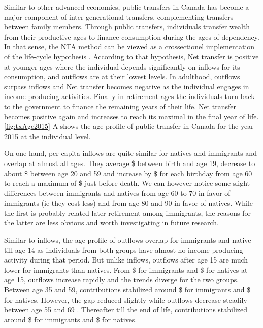 Similar to other advanced economies, public transfers in Canada has become a major component of inter-generational transfers, complementing transfers between family members.
Through public transfers, individuals transfer wealth from their productive ages to finance consumption during the ages of dependency.
In that sense, the NTA method can be viewed as a crossectionel implementation of the life-cycle hypothesis \citep{Ando:1963ea,Deaton:2005vr}.
According to that hypothesis, Net transfer is positive at younger ages where the individual depends significantly on inflows for its consumption, and outflows are at their lowest levels.
In adulthood, outflows surpass inflows and Net transfer becomes negative as the individual engages in income producing activities.
Finally in retirement ages the individuals turn back to the government to finance the remaining years of their life.
Net transfer becomes positive again and increases to reach its maximal in the final year of life. \autoref{fig:txAge2015}-A shows the age profile of public transfer in Canada for the year 2015 at the individual level.

\vspace{0.7em}\par
On one hand, per-capita inflows are quite similar for natives and immigrants and overlap at almost all ages.
They average \$ between birth and age 19, decrease to about \$ between age 20 and 59 and increase by \$ for each birthday from age 60 to reach a maximum of \$ just before death.
We can however notice some slight differences between immigrants and natives from age 60 to 70 in favor of immigrants (ie they cost less) and from age 80 and 90 in favor of natives.
While the first is probably related later retirement among immigrants, the reasons for the latter are less obvious and worth investigating in future research.

\vspace{0.7em}\par
Similar to inflows, the age profile of outflows overlap for immigrants and native till age 14 as individuals from both groups have almost no income producing activity during that period.
But unlike inflows, outflows after age 15 are much lower for immigrants than natives.
From \$ for immigrants and \$ for natives at age 15, outflows increase rapidly and the trends diverge for the two groups.
Between age 35 and 59, contributions stabilized around \$ for immigrants and \$ for natives.
However, the gap reduced slightly while outflows decrease steadily between age 55 and 69 .
Thereafter till the end of life, contributions stabilized around \$ for immigrants and \$ for natives.

